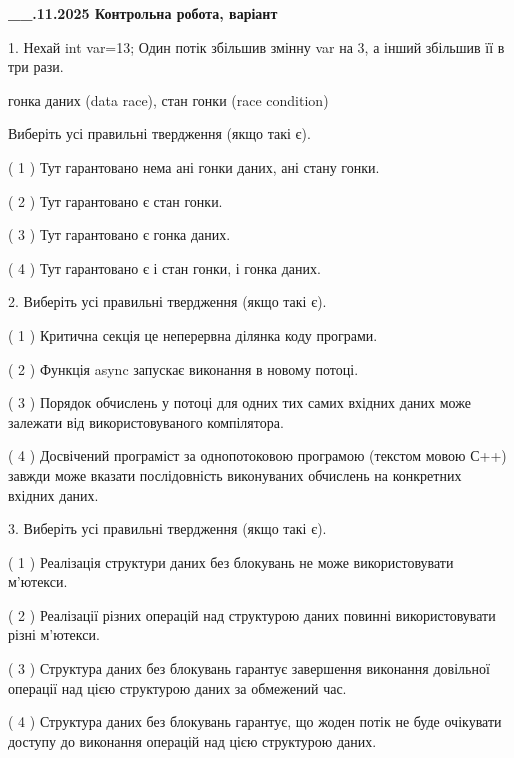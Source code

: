 \documentclass[12pt, ukrainian]{article}
\begin{document}
\begin {large}

\textbf{\_\_.11.2025 Контрольна робота, варіант  }\par


{
1. Нехай int var=13; Один потік збільшив змінну var на 3, а інший збільшив її в три рази.

гонка даних (data race), стан гонки (race condition)

Виберіть усі правильні твердження (якщо такі є).\par
\vspace{2mm}
( 1 ) Тут гарантовано нема ані гонки даних, ані стану гонки.%

( 2 ) Тут гарантовано є стан гонки.%

( 3 ) Тут гарантовано є гонка даних.%

( 4 ) Тут гарантовано є і стан гонки, і гонка даних.%


2. Виберіть усі правильні твердження (якщо такі є).\par
\vspace{2mm}

( 1 ) Критична секція це неперервна ділянка коду програми.%

( 2 ) Функція async запускає виконання в новому потоці.%

( 3 ) Порядок обчислень у потоці для одних тих самих вхідних даних може залежати від використовуваного компілятора.%

( 4 ) Досвічений програміст за однопотоковою програмою (текстом мовою С++) завжди може вказати послідовність виконуваних обчислень на конкретних вхідних даних.%


3. Виберіть усі правильні твердження (якщо такі є).\par
\vspace{2mm}

( 1 ) Реалізація структури даних без блокувань не може використовувати м’ютекси.%

( 2 ) Реалізації різних операцій над структурою даних повинні використовувати різні м’ютекси.%

( 3 ) Структура даних без блокувань гарантує завершення виконання довільної операції над цією структурою даних за обмежений час.%

( 4 ) Структура даних без блокувань гарантує, що жоден потік не буде очікувати доступу до виконання операцій над цією структурою даних.%


}
\end{large}
\end{document}
